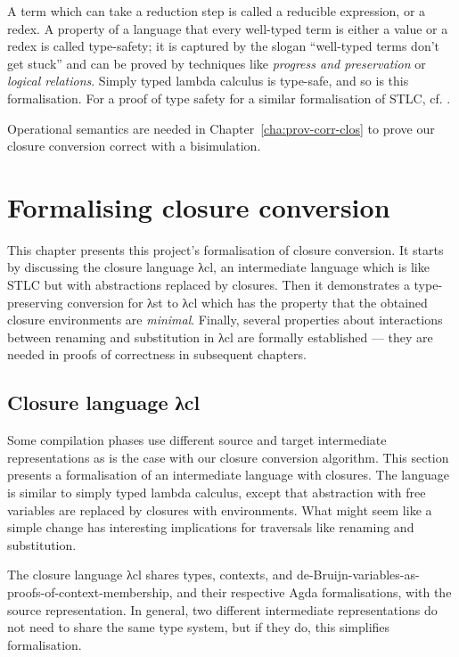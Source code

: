 \documentclass[bsc,frontabs,oneside,singlespacing,parskip,deptreport]{infthesis}
\theoremstyle{definition}
\theoremstyle{lemma}
\begin{document}
A term which can take a reduction step is called a reducible
expression, or a redex. A property of a language that every well-typed
term is either a value or a redex is called type-safety; it is
captured by the slogan ``well-typed terms don't get stuck'' and can be
proved by techniques like \textit{progress and preservation} or
\textit{logical relations}. Simply typed lambda calculus is type-safe,
and so is this formalisation. For a proof of type safety for a similar
formalisation of STLC, cf. \cite{DBLP:conf/sbmf/Wadler18}.

Operational semantics are needed in Chapter~\ref{cha:prov-corr-clos}
to prove our closure conversion correct with a bisimulation.

\chapter{Formalising closure conversion}
\label{cha:agda-development}

This chapter presents this project's formalisation of closure
conversion. It starts by discussing the closure language λcl, an
intermediate language which is like STLC but with abstractions
replaced by closures. Then it demonstrates a type-preserving
conversion for λst to λcl which has the property that the obtained
closure environments are \textit{minimal}.  Finally, several
properties about interactions between renaming and substitution in λcl
are formally established --- they are needed in proofs of correctness
in subsequent chapters.

\section{Closure language λcl}
\label{sec:closure-language-cl}

Some compilation phases use different source and target intermediate
representations as is the case with our closure conversion
algorithm. This section presents a formalisation of an intermediate
language with closures. The language is similar to
simply typed lambda calculus, except that abstraction with free
variables are replaced by closures with environments. What might seem
like a simple change has interesting implications for traversals like
renaming and substitution.

The closure language λcl shares types, contexts, and
de-Bruijn-variables-as-proofs-of-context-membership, and their
respective Agda formalisations, with the source representation. In
general, two different intermediate representations do not need to
share the same type system, but if they do, this simplifies
formalisation.
\end{document}
